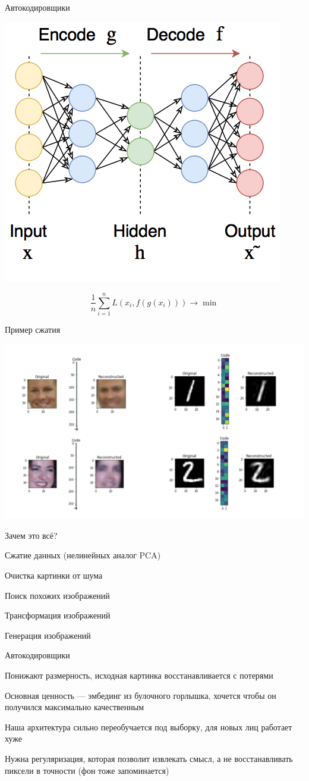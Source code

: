 \documentclass[notes,12pt, aspectratio=169]{beamer}
\newenvironment{wideitemize}{\itemize\addtolength{\itemsep}{10pt}}{\enditemize}
\begin{document}
\begin{frame}{Автокодировщики}
		\begin{center}
			\includegraphics[width=.42\linewidth]{auto.png}
		\end{center} \pause
		\[
		\frac{1}{n} \sum_{i=1}^n L(x_i, f(g(x_i))) \to \min 
		\]
\end{frame}


\begin{frame}{Пример сжатия}
	\begin{center}
			\includegraphics[width=.8\linewidth]{ato_enc.png}
		\end{center}
\end{frame}

\begin{frame}{Зачем это всё?}
\begin{wideitemize}
	\item  Сжатие данных (нелинейных аналог PCA)
	\item  Очистка картинки от шума
	\item  Поиск похожих изображений
	\item  Трансформация изображений
	\item  Генерация изображений
\end{wideitemize}
\end{frame}


\begin{frame}{Автокодировщики}
\begin{wideitemize}
	\item  Понижают размерность, исходная картинка восстанавливается с потерями
	\item  Основная ценность — эмбединг из булочного горлышка, хочется чтобы он получился максимально качественным
	\item  Наша архитектура сильно переобучается под выборку, для новых лиц работает хуже
	\item  Нужна регуляризация, которая позволит извлекать смысл, а не восстанавливать пиксели в точности (фон тоже запоминается)
\end{wideitemize}
\end{frame}
\end{document}
